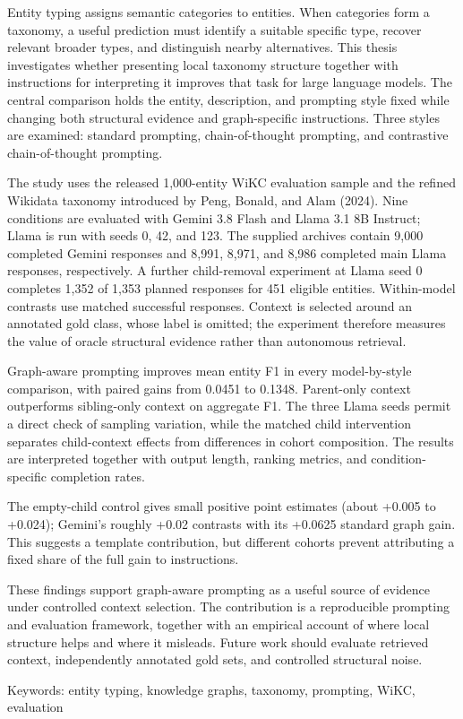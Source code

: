 
Entity typing assigns semantic categories to entities. When categories form a taxonomy, a useful prediction must identify a suitable specific type, recover relevant broader types, and distinguish nearby alternatives. This thesis investigates whether presenting local taxonomy structure together with instructions for interpreting it improves that task for large language models. The central comparison holds the entity, description, and prompting style fixed while changing both structural evidence and graph-specific instructions. Three styles are examined: standard prompting, chain-of-thought prompting, and contrastive chain-of-thought prompting.


The study uses the released 1,000-entity WiKC evaluation sample and the refined Wikidata taxonomy introduced by Peng, Bonald, and Alam (2024). Nine conditions are evaluated with Gemini 3.8 Flash and Llama 3.1 8B Instruct; Llama is run with seeds 0, 42, and 123. The supplied archives contain 9,000 completed Gemini responses and 8,991, 8,971, and 8,986 completed main Llama responses, respectively. A further child-removal experiment at Llama seed 0 completes 1,352 of 1,353 planned responses for 451 eligible entities. Within-model contrasts use matched successful responses. Context is selected around an annotated gold class, whose label is omitted; the experiment therefore measures the value of oracle structural evidence rather than autonomous retrieval.


Graph-aware prompting improves mean entity F1 in every model-by-style comparison, with paired gains from 0.0451 to 0.1348. Parent-only context outperforms sibling-only context on aggregate F1. The three Llama seeds permit a direct check of sampling variation, while the matched child intervention separates child-context effects from differences in cohort composition. The results are interpreted together with output length, ranking metrics, and condition-specific completion rates.


The empty-child control gives small positive point estimates (about +0.005 to +0.024); Gemini’s roughly +0.02 contrasts with its +0.0625 standard graph gain. This suggests a template contribution, but different cohorts prevent attributing a fixed share of the full gain to instructions.


These findings support graph-aware prompting as a useful source of evidence under controlled context selection. The contribution is a reproducible prompting and evaluation framework, together with an empirical account of where local structure helps and where it misleads. Future work should evaluate retrieved context, independently annotated gold sets, and controlled structural noise.


{\small Keywords: entity typing, knowledge graphs, taxonomy, prompting, WiKC, evaluation\par}

